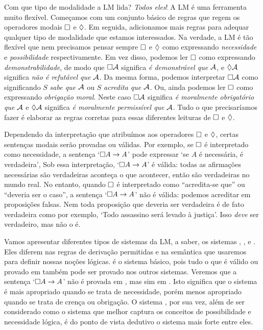 Com que tipo de modalidade a LM lida? \emph{Todos eles}! A LM é uma ferramenta muito flexível. Começamos com um conjunto básico de regras que regem os operadores modais $\Box$ e $\Diamond$. Em seguida,  adicionamos mais regras para  adequar qualquer tipo de modalidade que estamos interessados.  Na verdade, a LM é tão flexível que nem precisamos pensar sempre  $\Box$ e $\Diamond$ como expressando \emph{necessidade} e \emph{possibilidade} respectivamente. Em vez disso, podemos ler $\Box$ como expressando \emph{demonstrabilidade}, de modo que $\Box\mathcal{A}$ significa   \emph{é demonstrável que} $\mathcal{A}$, e $\Diamond\mathcal{A}$ significa \emph{não é refutável que}  $\mathcal{A}$. Da mesma forma, podemos interpretar $\Box\mathcal{A}$ como significando  $S$ \emph{sabe que  $\mathcal{A}$} ou $S$ \emph{acredita que $\mathcal{A}$}. 
Ou, ainda podemos ler $\Box$ como expressando  \emph{obrigação moral}. Neste caso $\Box \mathcal{A}$ significa \emph{é moralmente obrigatório que} $\mathcal{A}$ e $\Diamond \mathcal{A}$ significa \emph{é moralmente permissível que} $\mathcal{A}$. Tudo o que precisaríamos fazer é elaborar as regras corretas para essas diferentes leituras de  $\Box$ e $\Diamond$.

  Dependendo da interpretação que atribuímos aos operadores $\Box$ e $\Diamond$, certas sentenças modais serão provadas ou válidas. Por exemplo,  se $\Box$ é interpretado como necessidade, a sentença  `$\Box A \rightarrow A$'  pode expressar  `se $A$ é necessária, é verdadeira',
  Sob essa  interpretação,  `$\Box A \rightarrow A$' é válida: todas as afirmações necessárias são verdadeiras aconteça o que acontecer, então são verdadeiras no mundo real. No entanto, quando   $\Box$  é interpretado como “acredita-se que” ou “deveria ser o caso”,  a sentença 
  `$\Box A \rightarrow A$' não é válida: podemos acreditar em proposições falsas. Nem toda proposição que deveria ser verdadeira é de fato verdadeira como por exemplo, `Todo assassino será levado à justiça'. Isso \emph{deve}  ser verdadeiro, mas não o é.

Vamos apresentar diferentes tipos de sistemas da LM, a saber, os sistemas  \mlK, \mlT, \mlSfour{} e \mlSfive.  Eles diferem nas regras de derivação permitidas e na semântica que usaremos para definir nossas noções lógicas.  \mlK{} é o sistema  básico, pois tudo o que é válido ou provado em \mlK{} também pode ser provado nos outros sistemas. 
Veremos que a sentença  `$\Box A \rightarrow A$'   não é provada em \mlK, mas sim em  \mlT. Isto significa que o sistema \mlT{} é mais apropriado quando se trata de necessidade, porém menos apropriado quando se trata de crença ou obrigação.
 O  sistema  \mlSfive, por sua vez, além de ser considerado como o sistema que melhor captura os conceitos de possibilidade e necessidade lógica, é do ponto de vista dedutivo o sistema mais forte entre eles. 
 

